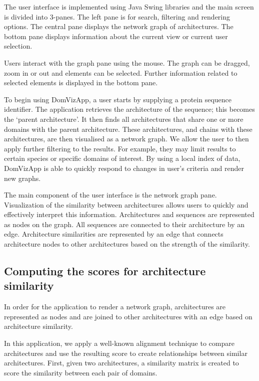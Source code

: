 The user interface is implemented using Java Swing libraries and the main screen is divided into 3-panes. The left pane is for search, filtering and rendering options. The central pane displays the network graph of architectures. The bottom pane displays information about the current view or current user selection.

Users interact with the graph pane using the mouse. The graph can be dragged, zoom in or out and elements can be selected. Further information related to selected elements is displayed in the bottom pane.

To begin using DomVizApp, a user starts by supplying a protein sequence identifier. The application retrieves the architecture of the sequence; this becomes the `parent architecture'. It then finds all architectures that share one or more domains with the parent architecture. These architectures, and chains with these architectures, are then visualised as a network graph. We allow the user to then apply further filtering to the results. For example, they may limit results to certain species or specific domains of interest. By using a local index of data, DomVizApp is able to quickly respond to changes in user's criteria and render new graphs.

The main component of the user interface is the network graph pane. Visualization of the similarity between architectures allows users to quickly and effectively interpret this information. Architectures and sequences are represented as nodes on the graph. All sequences are connected to their architecture by an edge. Architecture similarities are represented by an edge that connects architecture nodes to other architectures based on the strength of the similarity. 

\subsection{Computing the scores for architecture similarity}

In order for the application to render a network graph, architectures are represented as nodes and are joined to other architectures with an edge based on architecture similarity.

In this application, we apply a well-known alignment technique to compare architectures and use the resulting score to create relationships between similar architectures. First, given two architectures, a similarity matrix is created to score the similarity between each pair of domains. 

